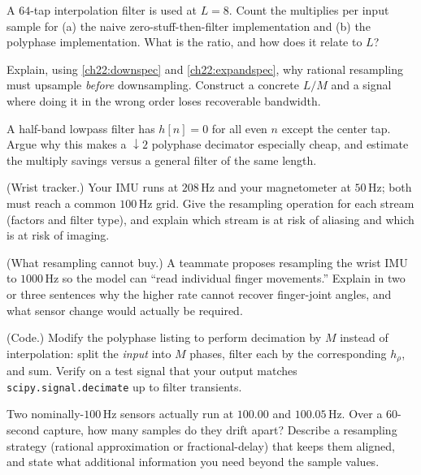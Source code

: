 \begin{exercise}
A $64$-tap interpolation filter is used at $L=8$. Count the multiplies per input
sample for (a) the naive zero-stuff-then-filter implementation and (b) the
polyphase implementation. What is the ratio, and how does it relate to $L$?
\end{exercise}

\begin{exercise}
Explain, using \eqref{ch22:downspec} and \eqref{ch22:expandspec}, why rational
resampling must upsample \emph{before} downsampling. Construct a concrete $L/M$
and a signal where doing it in the wrong order loses recoverable bandwidth.
\end{exercise}

\begin{exercise}
A half-band lowpass filter has $h[n]=0$ for all even $n$ except the center tap.
Argue why this makes a $\downarrow 2$ polyphase decimator especially cheap, and
estimate the multiply savings versus a general filter of the same length.
\end{exercise}

\begin{exercise}
(Wrist tracker.) Your IMU runs at $208$\,Hz and your magnetometer at $50$\,Hz; both
must reach a common $100$\,Hz grid. Give the resampling operation for each stream
(factors and filter type), and explain which stream is at risk of aliasing and
which is at risk of imaging.
\end{exercise}

\begin{exercise}
(What resampling cannot buy.) A teammate proposes resampling the wrist IMU to
$1000$\,Hz so the model
can ``read individual finger movements.'' Explain in two or three sentences why
the higher rate cannot recover finger-joint angles, and what sensor change would
actually be required.
\end{exercise}

\begin{exercise}
(Code.) Modify the polyphase listing to perform decimation by $M$ instead of
interpolation: split the \emph{input} into $M$ phases, filter each by the
corresponding $h_\rho$, and sum. Verify on a test signal that your output matches
\texttt{scipy.signal.decimate} up to filter transients.
\end{exercise}

\begin{exercise}
Two nominally-$100$\,Hz sensors actually run at $100.00$ and $100.05$\,Hz. Over a
$60$-second capture, how many samples do they drift apart? Describe a resampling
strategy (rational approximation or fractional-delay) that keeps them aligned,
and state what additional information you need beyond the sample values.
\end{exercise}
